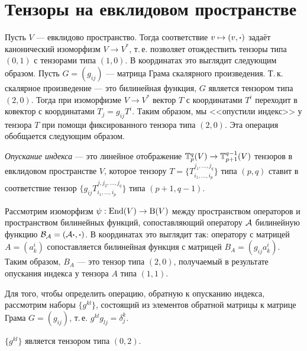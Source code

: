 \section{Тензоры на евклидовом пространстве}

Пусть $V$ --- евклидово пространство. Тогда соответствие $v \mapsto (v, \boldsymbol{\cdot})$ задаёт канонический изоморфизм $V \to V^\ast$, т.\,е. позволяет отождествить тензоры типа $(0, 1)$ с тензорами типа $(1, 0)$. В координатах это выглядит следующим образом. Пусть $G = (g_{ij})$ --- матрица Грама скалярного произведения. Т.\,к. скалярное произведение --- это билинейная функция, $G$ является тензором типа $(2, 0)$. Тогда при изоморфизме $V \to V^\ast$ вектор $T$ с координатами $T^i$ переходит в ковектор с координатами $T_j = g_{ij}T^i$. Таким образом, мы <<опустили индекс>> у тензора $T$ при помощи фиксированного тензора типа $(2, 0)$. Эта операция обобщается следующим образом.

\begin{definition}
    \textit{Опускание индекса} --- это линейное отображение $\mathbb{T}_p^q(V) \to \mathbb{T}_{p + 1}^{q - 1}(V)$ тензоров в евклидовом пространстве $V$, которое тензору $T = \{T_{i_1, \ldots, i_p}^{j_1, \ldots, j_q}\}$ типа $(p, q)$ ставит в соответствие тензор $\{g_{ij}T_{i_1, \ldots, i_p}^{j, j_2, \ldots, j_q}\}$ типа $(p + 1, q - 1)$.
\end{definition}

\begin{example}
    Рассмотрим изоморфизм $\psi: \operatorname{End}(V) \to \mathrm{B}(V)$ между пространством операторов и пространством билинейных функций, сопоставляющий оператору $\mathcal{A}$ билинейную функцию $\mathcal{B}_{\mathcal{A}} = (\mathcal{A}\boldsymbol{\cdot}, \boldsymbol{\cdot})$. В координатах это выглядит так: оператору с матрицей $A = (a^i_k)$ сопоставляется билинейная функция с матрицей $B_A = (g_{ij}a^i_k)$. Таким образом, $B_A$ --- это тензор типа $(2, 0)$, получаемый в результате опускания индекса у тензора $A$ типа $(1, 1)$.
\end{example}

Для того, чтобы определить операцию, обратную к опусканию индекса, рассмотрим наборы $\{g^{kl}\}$, состоящий из элементов обратной матрицы к матрице Грама $G = (g_{ij})$, т.\,е. $g^{kl}g_{lj} = \delta^k_j$.

\begin{proposal}
    $\{g^{kl}\}$ является тензором типа $(0, 2)$.
\end{proposal}

